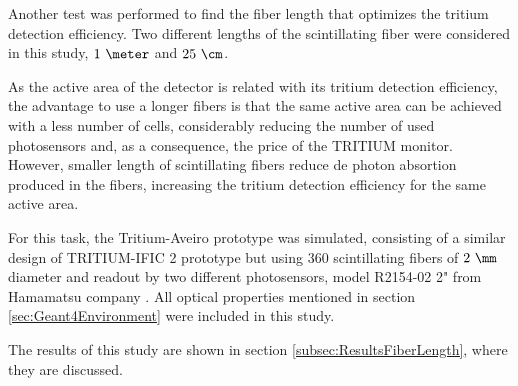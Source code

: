 Another test was performed to find the fiber length that optimizes the tritium detection efficiency. Two different lengths of the scintillating fiber were considered in this study, $1~\meter$ and $25~\cm$. 

As the active area of the detector is related with its tritium detection efficiency, the advantage to use a longer fibers is that the same active area can be achieved with a less number of cells, considerably reducing the number of used photosensors and, as a consequence, the price of the TRITIUM monitor. However, smaller length of scintillating fibers reduce de photon absortion produced in the fibers, increasing the tritium detection efficiency for the same active area.

For this task, the Tritium-Aveiro prototype was simulated, consisting of a similar design of TRITIUM-IFIC 2 prototype but using $360$ scintillating fibers of $2~\mm$ diameter and readout by two different photosensors, model R2154-02 2" from Hamamatsu company \cite{DataSheetPMTsAveiro}. All optical properties mentioned in section \ref{sec:Geant4Environment} were included in this study.

The results of this study are shown in section \ref{subsec:ResultsFiberLength}, where they are discussed.